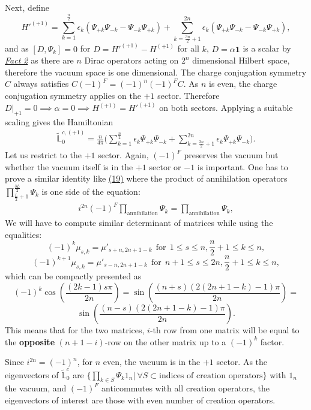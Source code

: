\documentclass[twoside,11pt,titlepage]{amsart}
\renewcommand{\=}[1]{\stackrel{#1}{=}} %
\theoremstyle{definition}
\theoremstyle{remark}
\begin{document}
Next, define
$$H'^{(+1)}= \sum_{k=1}^{\frac{n}{2}} \epsilon_k(\Psi_{+k}\Psi_{-k}-\Psi_{-k}\Psi_{+k}) + \sum_{k=\frac{3n}{2}+1}^{2n} \epsilon_k(\Psi_{+k}\Psi_{-k}-\Psi_{-k}\Psi_{+k}),$$
and as $[D,\Psi_{k}]=0$ for $D=H'^{(+1)}-H^{(+1)}$ for all $k$, $D=\alpha \textbf{1}$ is a scalar by \hyperref[fct2]{\textit{Fact 2}} as there are $n$ Dirac operators acting on $2^n$ dimensional Hilbert space, therefore the vacuum space is one dimensional. The charge conjugation symmetry $C$ always satisfies $C(-1)^F=(-1)^n(-1)^FC$. As $n$ is even, the charge conjugation symmetry applies on the $+1$ sector. Therefore $D|_{+1}=0 \implies \alpha=0 \implies H^{(+1)}=H'^{(+1)}$ on both sectors. Applying a suitable scaling gives the Hamiltonian
\begin{align}\label{eq25}
\widetilde{\mathbb{L}}_0^{c,(+1)}=\frac{n}{4\pi}\Big(\sum_{k=1}^{\frac{n}{2}} \epsilon_k\Psi_{+k}\Psi_{-k}+\sum_{k=\frac{3n}{2}+1}^{2n} \epsilon_k\Psi_{+k}\Psi_{-k}\Big).
\end{align}
Let us restrict to the $+1$ sector. Again, $(-1)^F$ preserves the vacuum but whether the vacuum itself is in the $+1$ sector or $-1$ is important. One has to prove a similar identity like \hyperref[eq19]{(19)} where the product of annihilation operators $\prod_{\frac{L}{2}+1}^{\frac{3L}{2}} \Psi_{k}$ is one side of the equation:
\begin{align}\label{eq26}
i^{2n}(-1)^F \prod_{\text{annihilation}} \Psi_{k}=\prod_{\text{annihilation}} \Psi_{k},
\end{align}
We will have to compute similar determinant of matrices while using the equalities:
$$(-1)^k\mu_{s,k}=\mu'_{s+n,2n+1-k}  \ \ \text{for} \ \  1\le s \le n, \frac{n}{2}+1 \le k \le n,$$  $$(-1)^{k+1}\mu_{s,k}=\mu'_{s-n,2n+1-k} \ \ \text{for} \ \ n+1\le s \le 2n, \frac{n}{2}+1 \le k \le n,$$
which can be compactly presented as
$$(-1)^k\cos(\frac{(2k-1)s\pi}{2n})=\sin(\frac{(n+s)(2(2n+1-k)-1)\pi}{2n})=$$
$$\sin(\frac{(n-s)(2(2n+1-k)-1)\pi}{2n}).$$
This means that for the two matrices, $i$-th row from one matrix will be equal to the \textbf{opposite} $(n+1-i)$-row on the other matrix up to a $(-1)^k$ factor. 

Since $i^{2n}=(-1)^n$, for $n$ even, the vacuum is in the $+1$ sector. As the eigenvectors of $\widetilde{\mathbb{L}}_0^{c}$ are $\{\prod_{k\in S}\Psi_k1_n| \ \forall S \subset \text{indices of creation operators}\}$ with $1_n$ the vacuum, and $(-1)^F$ anticommutes with all creation operators, the eigenvectors of interest are those with even number of creation operators. 
\end{document}
